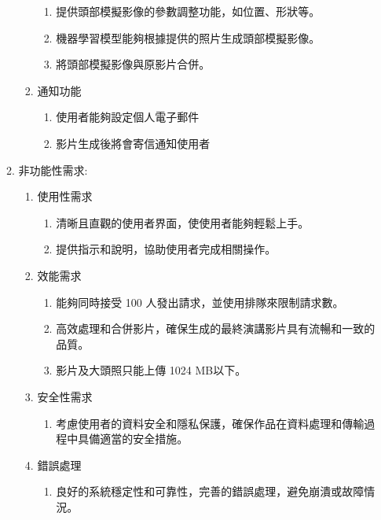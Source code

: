 \documentclass[12pt]{article}
\begin{document}
\begin{enumerate}
\begin{enumerate}[label=\Alph*.]
\begin{enumerate}
            \begin{enumerate}[label=(\arabic*)]
              \item 提供頭部模擬影像的參數調整功能，如位置、形狀等。
              \item 機器學習模型能夠根據提供的照片生成頭部模擬影像。
              \item 將頭部模擬影像與原影片合併。
            \end{enumerate}
          \item 通知功能
            \begin{enumerate}[label=(\arabic*)]
              \item 使用者能夠設定個人電子郵件
              \item 影片生成後將會寄信通知使用者
            \end{enumerate}
        \end{enumerate}
      \item 非功能性需求:
        \begin{enumerate}
          \item 使用性需求
            \begin{enumerate}[label=(\arabic*)]
              \item 清晰且直觀的使用者界面，使使用者能夠輕鬆上手。
              \item 提供指示和說明，協助使用者完成相關操作。
            \end{enumerate}
          \item 效能需求
            \begin{enumerate}[label=(\arabic*)]
              \item 能夠同時接受 100 人發出請求，並使用排隊來限制請求數。
              \item 高效處理和合併影片，確保生成的最終演講影片具有流暢和一致的品質。
              \item 影片及大頭照只能上傳 1024 MB以下。
            \end{enumerate}
          \item 安全性需求
            \begin{enumerate}[label=(\arabic*)]
              \item 考慮使用者的資料安全和隱私保護，確保作品在資料處理和傳輸過程中具備適當的安全措施。
            \end{enumerate}
          \item 錯誤處理
            \begin{enumerate}[label=(\arabic*)]
              \item 良好的系統穩定性和可靠性，完善的錯誤處理，避免崩潰或故障情況。

\end{enumerate}
\end{enumerate}
\end{enumerate}
\end{enumerate}
\end{document}
